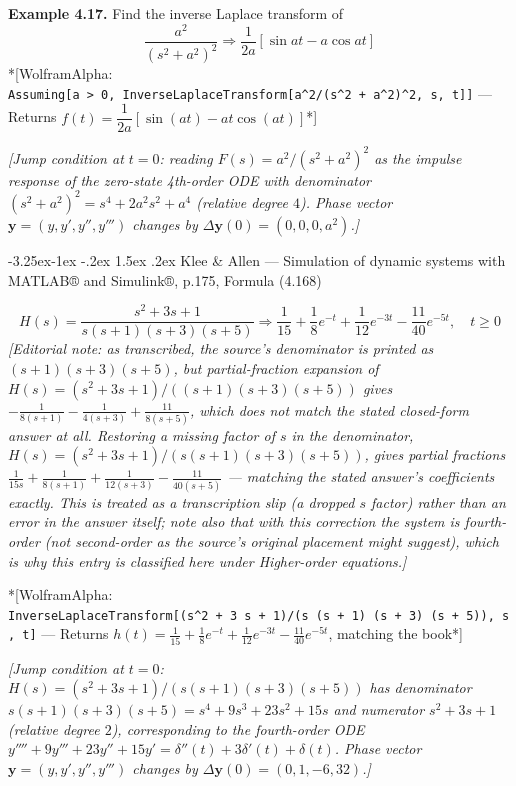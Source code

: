 \documentclass[
  11pt,
]{article}
\makeatletter
\providecommand{\implies}{\Longrightarrow}
\renewcommand\paragraph{\@startsection{paragraph}{4}{\z@}%
                                     {-3.25ex\@plus -1ex \@minus -.2ex}%
                                     {1.5ex \@plus .2ex}%
                                     {\normalfont\normalsize\bfseries}}
\makeatother
\begin{document}
\textbf{Example 4.17.} Find the inverse Laplace transform of \[
\frac{a^2}{(s^2 + a^2)^2}
\implies
\frac{1}{2a} \left[ \sin at - a \cos at \right]
\] *{[}WolframAlpha:
\texttt{Assuming{[}a\ \textgreater{}\ 0,\ InverseLaplaceTransform{[}a\^{}2/(s\^{}2\ +\ a\^{}2)\^{}2,\ s,\ t{]}{]}}
--- Returns
\(f(t) = \dfrac{1}{2a}\left[\sin(at) - at\cos(at)\right]\)*{]}

\emph{{[}Jump condition at \(t=0\): reading \(F(s)=a^2/(s^2+a^2)^2\) as
the impulse response of the zero-state 4th-order ODE with denominator
\((s^2+a^2)^2=s^4+2a^2s^2+a^4\) (relative degree \(4\)). Phase vector
\(\mathbf y=(y,y',y'',y''')\) changes by
\(\Delta\mathbf y(0)=(0,0,0,a^2)\).{]}}

\hypertarget{klee-allen-simulation-of-dynamic-systems-with-matlab-and-simulink-p.175-formula-4.168}{%
\paragraph{Klee \& Allen --- Simulation of dynamic systems with MATLAB®
and Simulink®, p.175, Formula
(4.168)}\label{klee-allen-simulation-of-dynamic-systems-with-matlab-and-simulink-p.175-formula-4.168}}

\[
H(s) = \frac{s^2 + 3s + 1}{s(s+1)(s+3)(s+5)} \implies \frac{1}{15} + \frac{1}{8} e^{-t} + \frac{1}{12} e^{-3t} - \frac{11}{40} e^{-5t}, \quad t \geq 0
\] \emph{{[}Editorial note: as transcribed, the source's denominator is
printed as \((s+1)(s+3)(s+5)\), but partial-fraction expansion of
\(H(s)=(s^2+3s+1)/((s+1)(s+3)(s+5))\) gives
\(-\frac{1}{8(s+1)} - \frac{1}{4(s+3)} + \frac{11}{8(s+5)}\), which does
not match the stated closed-form answer at all. Restoring a missing
factor of \(s\) in the denominator,
\(H(s)=(s^2+3s+1)/(s(s+1)(s+3)(s+5))\), gives partial fractions
\(\frac{1}{15s}+\frac{1}{8(s+1)}+\frac{1}{12(s+3)}-\frac{11}{40(s+5)}\)
--- matching the stated answer's coefficients exactly. This is treated
as a transcription slip (a dropped \(s\) factor) rather than an error in
the answer itself; note also that with this correction the system is
fourth-order (not second-order as the source's original placement might
suggest), which is why this entry is classified here under Higher-order
equations.{]}}

*{[}WolframAlpha:
\texttt{InverseLaplaceTransform{[}(s\^{}2\ +\ 3\ s\ +\ 1)/(s\ (s\ +\ 1)\ (s\ +\ 3)\ (s\ +\ 5)),\ s,\ t{]}}
--- Returns
\(h(t) = \frac{1}{15} + \frac{1}{8} e^{-t} + \frac{1}{12} e^{-3t} - \frac{11}{40} e^{-5t}\),
matching the book*{]}

\emph{{[}Jump condition at \(t=0\):
\(H(s)=(s^2+3s+1)/(s(s+1)(s+3)(s+5))\) has denominator
\(s(s+1)(s+3)(s+5)=s^4+9s^3+23s^2+15s\) and numerator \(s^2+3s+1\)
(relative degree \(2\)), corresponding to the fourth-order ODE
\(y''''+9y'''+23y''+15y'=\delta''(t)+3\delta'(t)+\delta(t)\). Phase
vector \(\mathbf y=(y,y',y'',y''')\) changes by
\(\Delta\mathbf y(0)=(0,1,-6,32)\).{]}}
\end{document}
